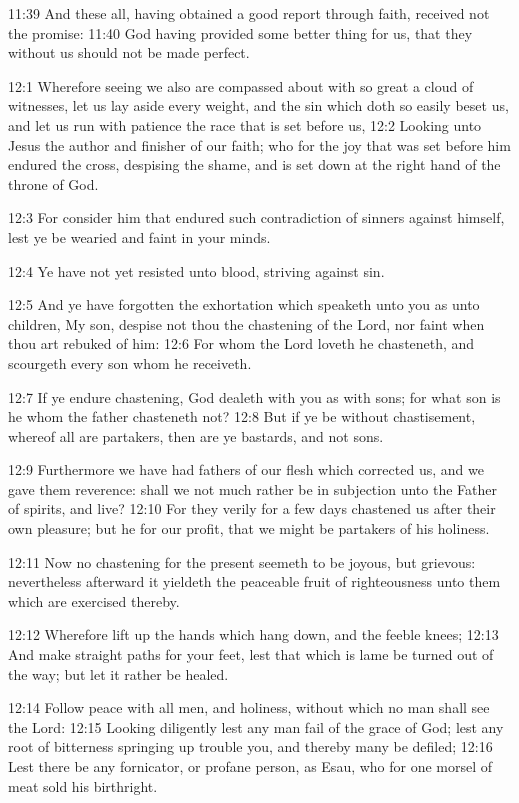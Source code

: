 11:39 And these all, having obtained a good report through faith, received not the promise: 11:40 God having provided some better thing for us, that they without us should not be made perfect.

12:1 Wherefore seeing we also are compassed about with so great a cloud of witnesses, let us lay aside every weight, and the sin which doth so easily beset us, and let us run with patience the race that is set before us, 12:2 Looking unto Jesus the author and finisher of our faith; who for the joy that was set before him endured the cross, despising the shame, and is set down at the right hand of the throne of God.

12:3 For consider him that endured such contradiction of sinners against himself, lest ye be wearied and faint in your minds.

12:4 Ye have not yet resisted unto blood, striving against sin.

12:5 And ye have forgotten the exhortation which speaketh unto you as unto children, My son, despise not thou the chastening of the Lord, nor faint when thou art rebuked of him: 12:6 For whom the Lord loveth he chasteneth, and scourgeth every son whom he receiveth.

12:7 If ye endure chastening, God dealeth with you as with sons; for what son is he whom the father chasteneth not?  12:8 But if ye be without chastisement, whereof all are partakers, then are ye bastards, and not sons.

12:9 Furthermore we have had fathers of our flesh which corrected us, and we gave them reverence: shall we not much rather be in subjection unto the Father of spirits, and live?  12:10 For they verily for a few days chastened us after their own pleasure; but he for our profit, that we might be partakers of his holiness.

12:11 Now no chastening for the present seemeth to be joyous, but grievous: nevertheless afterward it yieldeth the peaceable fruit of righteousness unto them which are exercised thereby.

12:12 Wherefore lift up the hands which hang down, and the feeble knees; 12:13 And make straight paths for your feet, lest that which is lame be turned out of the way; but let it rather be healed.

12:14 Follow peace with all men, and holiness, without which no man shall see the Lord: 12:15 Looking diligently lest any man fail of the grace of God; lest any root of bitterness springing up trouble you, and thereby many be defiled; 12:16 Lest there be any fornicator, or profane person, as Esau, who for one morsel of meat sold his birthright.

